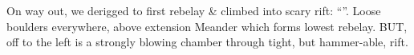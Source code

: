 On way out, we derigged to first rebelay \& climbed into scary rift:
``''. Loose boulders everywhere, above extension
Meander which forms lowest rebelay. BUT, off to the left is a strongly
blowing chamber through tight, but hammer-able, rift.


\begin{figure}
\checkoddpage \ifoddpage \forcerectofloat \else \forceversofloat \fi
\centering
    \begin{subfigure}{0.49\textwidth}
        \centering
        \caption{} \label{ice planika}
    \end{subfigure}
        \hfill
\begin{subfigure}{0.49\textwidth}
\centering

\end{subfigure}
\end{figure}
